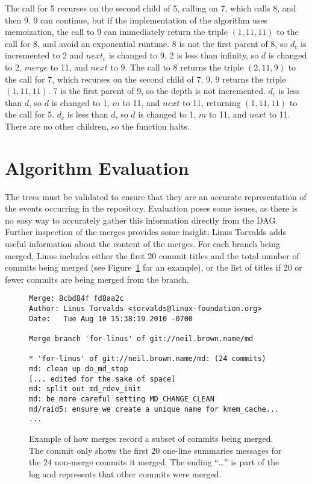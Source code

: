 The call for 5 recurses on the second child of 5, calling on 7, which
calls 8, and then 9. 9 can continue, but if the implementation of the
algorithm uses memoization, the call to 9 can immediately return the
triple $(1, 11, 11)$ to the call for 8, and avoid an exponential
runtime. 8 is not the first parent of 8, so $d_c$ is incremented to 2
and $next_c$ is changed to 9. 2 is less than infinity, so $d$ is changed
to 2, $merge$ to 11, and $next$ to 9. The call to 8 returns the triple
$(2, 11, 9)$ to the call for 7, which recurses on the second child of 7,
9. 9 returns the triple $(1, 11, 11)$. 7 is the first parent of 9, so
the depth is not incremented. $d_c$ is less than $d$, so $d$ is changed
to 1, $m$ to 11, and $next$ to 11, returning $(1, 11, 11)$ to the call
for 5. $d_c$ is less than $d$, so $d$ is changed to 1, $m$ to 11, and
$next$ to 11. There are no other children, so the function halts.

\section{Algorithm Evaluation}
\label{sec:algorithm_evaluation}

The trees must be validated to ensure that they are an accurate
representation of the events occurring in the repository. Evaluation
poses some issues, as there is no easy way to accurately gather this
information directly from the DAG\@. Further inspection of the merges
provides some insight; Linus Torvalds adds useful information about the
content of the merges. For each branch being merged, Linus includes
either the first 20 commit titles and the total number of commits being
merged (see Figure~\ref{fig:sampleMerge} for an example), or the list of
titles if 20 or fewer commits are being merged from the branch.

\begin{figure}[htpb]
  \centering
\begin{textbox}
  \begin{verbatim}
Merge: 8cbd84f fd8aa2c
Author: Linus Torvalds <torvalds@linux-foundation.org>
Date:   Tue Aug 10 15:38:19 2010 -0700

Merge branch 'for-linus' of git://neil.brown.name/md

* 'for-linus' of git://neil.brown.name/md: (24 commits)
md: clean up do_md_stop
[... edited for the sake of space]
md: split out md_rdev_init
md: be more careful setting MD_CHANGE_CLEAN
md/raid5: ensure we create a unique name for kmem_cache...
...
  \end{verbatim}
\end{textbox}
  \caption{Example of how merges record a subset of commits being merged. The
                commit only shows the first 20 one-line summaries messages for the 24
                non-merge commits it merged. The ending ``\ldots'' is part of the log
                and represents that other commits were merged.}
  \label{fig:sampleMerge}
\end{figure}


